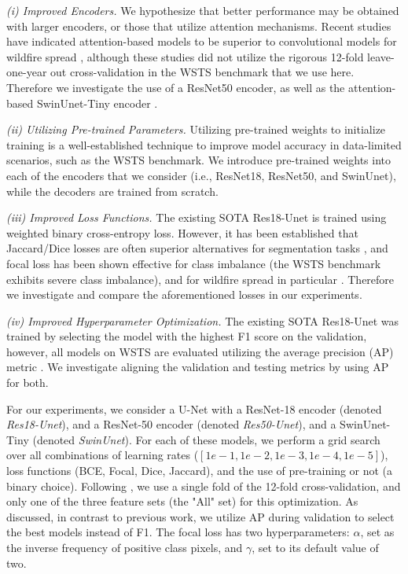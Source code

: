 \textit{(i) Improved Encoders.} We hypothesize that better performance may be obtained with larger encoders, or those that utilize attention mechanisms. Recent studies have indicated attention-based models to be superior to convolutional models for wildfire spread \cite{li2024wildfire, zou2023attention, shah2023wildfire, xiao2024wildfire}, although these studies did not utilize the rigorous 12-fold leave-one-year out cross-validation in the WSTS benchmark that we use here.  Therefore we investigate the use of a ResNet50 \cite{he2016deep} encoder, as well as the attention-based SwinUnet-Tiny encoder \cite{cao2022swin}.  

\textit{(ii) Utilizing Pre-trained Parameters.} Utilizing pre-trained weights to initialize training is a well-established technique to improve model accuracy in data-limited scenarios, such as the WSTS benchmark. We introduce pre-trained weights into each of the encoders that we consider (i.e., ResNet18, ResNet50, and SwinUnet), while the decoders are trained from scratch.  

\textit{(iii) Improved Loss Functions.} The existing SOTA Res18-Unet \cite{gerard2023wildfirespreadts} is trained using weighted binary cross-entropy loss. However, it has been established that Jaccard/Dice losses are often superior alternatives for segmentation tasks \cite{eelbode2020optimization}, and focal loss has been shown effective for class imbalance \cite{lin2017focal} (the WSTS benchmark exhibits severe class imbalance), and for wildfire spread in particular \cite{fitzgerald2023paying}. Therefore we investigate and compare the aforementioned losses in our experiments.      

\textit{(iv) Improved Hyperparameter Optimization.} The existing SOTA Res18-Unet \cite{gerard2023wildfirespreadts} was trained by selecting the model with the highest F1 score on the validation, however, all models on WSTS are evaluated utilizing the average precision (AP) metric \cite{gerard2023wildfirespreadts}.  We investigate aligning the validation and testing metrics by using AP for both.    

For our experiments, we consider a U-Net with a ResNet-18 encoder (denoted \textit{Res18-Unet}), and a ResNet-50 encoder (denoted \textit{Res50-Unet}), and a SwinUnet-Tiny (denoted \textit{SwinUnet}).  For each of these models, we perform a grid search over all combinations of learning rates ($[1e-1,1e-2,1e-3,1e-4, 1e-5]$), loss functions (BCE, Focal, Dice, Jaccard), and the use of pre-training or not (a binary choice).  Following \cite{gerard2023wildfirespreadts}, we use a single fold of the 12-fold cross-validation, and only one of the three feature sets (the "All" set) for this optimization. As discussed, in contrast to previous work, we utilize AP during validation to select the best models instead of F1.  The focal loss has two hyperparameters: $\alpha$, set as the inverse frequency of positive class pixels, and $\gamma$, set to its default value of two.  

